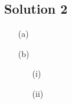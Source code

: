 \subsection*{Solution 2}

\begin{itemize}
\item[(a)]
\todo
\item[(b)]
\begin{itemize}
\item[(i)]
\todo
\item[(ii)]
\todo
\end{itemize}
\end{itemize}

